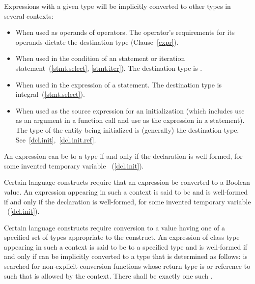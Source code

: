 \pnum
\begin{note}
Expressions with a given type will be implicitly converted to other
types in several contexts:

\begin{itemize}
\item When used as operands of operators. The operator's requirements
for its operands dictate the destination type (Clause~\ref{expr}).

\item When used in the condition of an  statement or iteration
statement~(\ref{stmt.select}, \ref{stmt.iter}). The destination type is
.

\item When used in the expression of a  statement. The
destination type is integral~(\ref{stmt.select}).

\item When used as the source expression for an initialization (which
includes use as an argument in a function call and use as the expression
in a  statement). The type of the entity being initialized
is (generally) the destination type.
See~\ref{dcl.init},~\ref{dcl.init.ref}.
\end{itemize}
\end{note}

\pnum
An expression  can be
%
 to a type  if and only if the
declaration  is well-formed, for some invented temporary
variable ~(\ref{dcl.init}).

\pnum
Certain language constructs require that an expression be converted to a Boolean
value. An expression  appearing in such a context is said to be
%
 and is well-formed if and only if
the declaration  is well-formed, for some invented temporary
variable ~(\ref{dcl.init}).

\pnum
Certain language constructs require conversion to a value having
one of a specified set of types appropriate to the construct. An
expression  of class type  appearing in such a
context is said to be
%
 to a specified type  and is
well-formed if and only if  can be implicitly converted to a type 
that is determined as follows:
 is searched for non-explicit conversion functions
whose return type is   or reference to 
 such that  is allowed by the context.
There shall be exactly one such .

